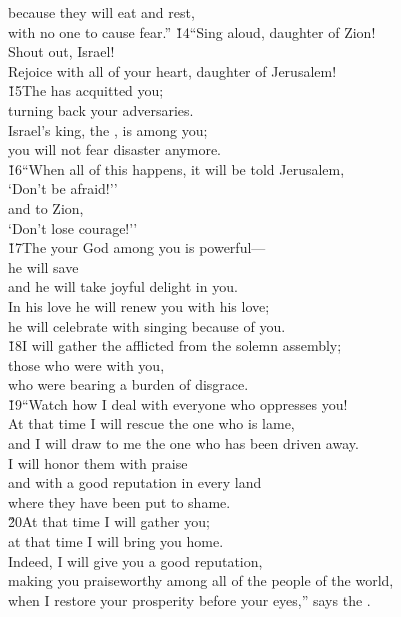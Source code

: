 \begin{poetry}
\poemll    because they will eat and rest, \\
\poemlll       with no one to cause fear.''
\poeml \v{14}``Sing aloud, daughter of Zion! \\
\poemll    Shout out, Israel! \\
\poemlll       Rejoice with all of your heart, daughter of Jerusalem! \\
\poeml \v{15}The  has acquitted you; \\
\poemll    turning back your adversaries. \\
\poeml Israel's king, the , is among you; \\
\poemll    you will not fear disaster anymore. \\
\poeml \v{16}``When all of this happens, it will be told Jerusalem, \\
\poemll    `Don't be afraid!'' \\
\poeml and to Zion, \\
\poemll    `Don't lose courage!'' \\
\poeml \v{17}The  your God among you is powerful--- \\
\poemll    he will save \\
\poeml and he will take joyful delight in you. \\
\poemll    In his love he will renew you with his love; \\
\poemlll       he will celebrate with singing because of you. \\
\poeml \v{18}I will gather the afflicted from the solemn assembly; \\
\poemll    those who were with you, \\
\poemlll       who were bearing a burden of disgrace. \\
\poeml \v{19}``Watch how I deal with everyone who oppresses you! \\
\poemll    At that time I will rescue the one who is lame, \\
\poemlll       and I will draw to me the one who has been driven away. \\
\poeml I will honor them with praise \\
\poemll    and with a good reputation in every land \\
\poemlll       where they have been put to shame. \\
\poeml \v{20}At that time I will gather you; \\
\poemll    at that time I will bring you home. \\
\poeml Indeed, I will give you a good reputation, \\
\poemll    making you praiseworthy among all of the people of the world, \\
\poemlll       when I restore your prosperity before your eyes,'' says the .\end{poetry}
